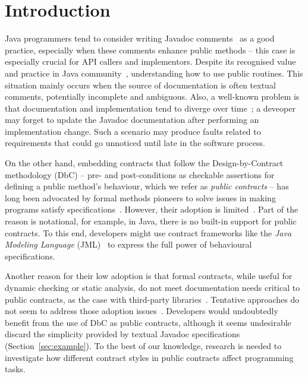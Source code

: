 \section{Introduction}
\label{sec:introduction}

Java programmers tend to consider writing Javadoc comments~\cite{javadoc-oracle} as a good practice,
especially when these comments enhance public methods -- this case is especially crucial for API callers and implementors. Despite its recognised value and practice in Java community~\cite{liveAPI},
understanding how to use public routines.
This situation mainly occurs when the source of documentation is often textual comments, potentially incomplete and ambiguous. Also, a well-known problem is that documentation and implementation tend to diverge over time~\cite{Estler-etal14}; 
a deveoper may forget to update the Javadoc documentation after performing an implementation change. Such a scenario may produce faults related to requirements that could go unnoticed until late in the software process.

On the other hand, embedding contracts that follow the Design-by-Contract methodology (DbC) -- pre- and post-conditions as checkable assertions for defining a public method's behaviour, which we refer as \emph{public contracts} -- has
long been advocated by formal methods pioneers to solve issues in making programs satisfy specifications~\cite{Hoare1969,Parnas2011}. 
However, their adoption is limited~\cite{Polikarpova-etal09}. 
Part of the reason is notational, for example, in Java, there is no built-in support for public contracts.
To this end, developers might use contract frameworks like the \emph{Java Modeling Language} (JML)~\cite{jml} to express the full power of behavioural specifications.

Another reason for their low adoption is that formal contracts, while useful for dynamic checking or static analysis, do not meet documentation needs critical to public contracts, as the case with third-party libraries~\cite{Leavens10,Parnas2011}. 
Tentative approaches do not seem to address those adoption issues~\cite{docAnalysis}.
Developers would undoubtedly benefit from the use of DbC as public contracts, although it seems undesirable discard the simplicity provided by textual Javadoc specifications (Section~\ref{sec:example}).
To the best of our knowledge, research is needed to investigate how different contract styles in public contracts affect programming tasks.

